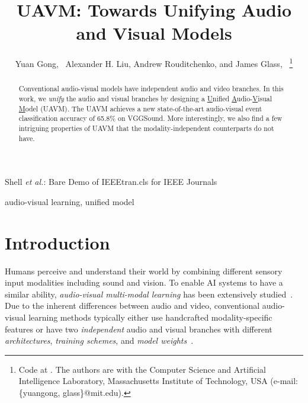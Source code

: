 \documentclass[journal]{IEEEtran}
\newcommand{\rev}[1]{{\color{dblue} #1}}
\begin{document}
\title{\rev{UAVM: Towards Unifying Audio and Visual Models}}

\author{Yuan Gong,~
        Alexander H. Liu,
        Andrew Rouditchenko,
        and James Glass,~
\thanks{Code at \href{https://github.com/yuangongnd/uavm}{\texttt{\color{blue}{github.com/yuangongnd/uavm}}}. The authors are with the Computer Science and Artificial Intelligence Laboratory, Massachusetts Institute of Technology, USA (e-mail: \{yuangong, glass\}@mit.edu).}}

{Shell \MakeLowercase{\textit{et al.}}: Bare Demo of IEEEtran.cls for IEEE Journals}
\maketitle

\begin{abstract}

\rev{Conventional audio-visual models have independent audio and video branches. In this work, we \emph{unify} the audio and visual branches by designing a \underline{U}nified \underline{A}udio-\underline{V}isual \underline{M}odel (UAVM). The UAVM achieves a new state-of-the-art audio-visual event classification accuracy of 65.8\% on VGGSound. More interestingly, we also find a few intriguing properties of UAVM that the modality-independent counterparts do not have.}

\end{abstract}

\begin{IEEEkeywords}
audio-visual learning, unified model
\end{IEEEkeywords}

\IEEEpeerreviewmaketitle
\section{Introduction}



Humans perceive and understand their world by combining different sensory input modalities including sound and vision. To enable AI systems to have a similar ability, \emph{audio-visual multi-modal learning} has been extensively studied~\cite{ramachandram2017deep,zhu2021deep}.
Due to the inherent differences between audio and video, conventional audio-visual learning methods typically either use handcrafted modality-specific features or have two \emph{independent} audio and visual branches with different \emph{architectures}, \emph{training schemes}, and \emph{model weights}~\cite{aytar2016soundnet,arandjelovic2017look,rouditchenko2021avlnet,monfort2021spoken,chang2022on}.
\end{document}

